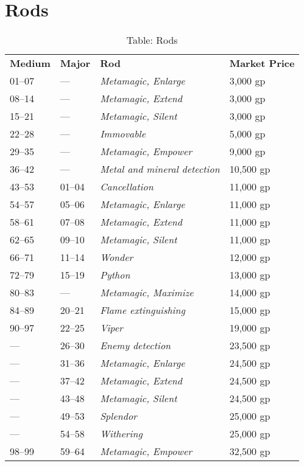 \section{Rods}

\label{f0}
\begin{table}[]
\sffamily
\caption{Table: Rods}
\setlength{\tabcolsep}{1pt}
\begin{tabularx}{\linewidth}{llXl}
\textbf{Medium} & \textbf{Major} & \textbf{Rod} & \textbf{Market Price}\\
01--07 & --- & \textit{Metamagic, Enlarge} & 3,000 gp \\
 08--14 & --- & \textit{Metamagic, Extend} & 3,000 gp \\
 15--21 & --- & \textit{Metamagic, Silent} & 3,000 gp \\
 22--28 & --- & \textit{Immovable} & 5,000 gp \\
 29--35 & --- & \textit{Metamagic, Empower} & 9,000 gp \\
 36--42 & --- & \textit{Metal and mineral detection} & 10,500 gp \\
 43--53 & 01--04 & \textit{Cancellation} & 11,000 gp \\
 54--57 & 05--06 & \textit{Metamagic, Enlarge} & 11,000 gp \\
 58--61 & 07--08 & \textit{Metamagic, Extend} & 11,000 gp \\
 62--65 & 09--10 & \textit{Metamagic, Silent} & 11,000 gp \\
 66--71 & 11--14 & \textit{Wonder} & 12,000 gp \\
 72--79 & 15--19 & \textit{Python} & 13,000 gp \\
 80--83 & --- & \textit{Metamagic, Maximize} & 14,000 gp \\
 84--89 & 20--21 & \textit{Flame extinguishing} & 15,000 gp \\
 90--97 & 22--25 & \textit{Viper} & 19,000 gp \\
 --- & 26--30 & \textit{Enemy detection} & 23,500 gp \\
 --- & 31--36 & \textit{Metamagic, Enlarge} & 24,500 gp \\
 --- & 37--42 & \textit{Metamagic, Extend} & 24,500 gp \\
 --- & 43--48 & \textit{Metamagic, Silent} & 24,500 gp \\
 --- & 49--53 & \textit{Splendor} & 25,000 gp \\
 --- & 54--58 & \textit{Withering} & 25,000 gp \\
 98--99 & 59--64 & \textit{Metamagic, Empower} & 32,500 gp \\

\end{tabularx}
\end{table}
